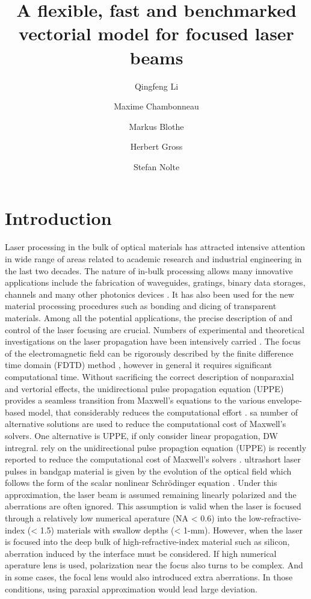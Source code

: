 \documentclass[9pt,twocolumn,twoside]{osajnl}
\title{A flexible, fast and benchmarked vectorial model for focused laser beams}
\author[1,*]{Qingfeng Li}
\author[1]{Maxime Chambonneau}
\author[1]{Markus Blothe}
\author[1,2]{Herbert Gross}
\author[1,2]{Stefan Nolte}
\affil[1]{Institute of Applied Physics, Abbe Ceter of Photonics, Friedirich-Schiller-University Jena, Albert-Einstein-Str. 15, 07745 Jena, Germany}
\affil[2]{Fraunhofer Institute for Applied Optics and Precision Engineering, Albert-Einstein-Str. 7, 07745 Jena, Germany}
\affil[*]{Corresponding author: qingfeng.li@uni-jena.de} %
\begin{document}
\maketitle

\section{Introduction}\label{section:1}

Laser processing in the bulk of optical materials has attracted intensive attention in wide range of areas related to academic research and industrial engineering in the last two decades. The nature of in-bulk processing allows many innovative applications include the fabrication of waveguides, gratings, binary data storages, channels and many other photonics devices \cite{Itoh2006, Gattass2008}. It has also been used for the new material processing procedures such as bonding \cite{Cvecek2019} and dicing \cite{Meyer2019} of transparent materials. Among all the potential applications, the precise description of  and control of the laser focusing are crucial. Numbers of experimental and theoretical investigations on the laser propagation have been intensively carried \cite{Couairon2007}. %
The focus of the electromagnetic field can be rigorously described by the finite difference time domain (FDTD) method \cite{liu2000three}, however in general it requires significant computational time. Without sacrificing the correct description of nonparaxial and vertorial effects, the unidirectional pulse propagation equation (UPPE) provides a seamless transition from Maxwell’s equations to the various envelope-based model, that considerably reduces the computational effort \cite{PhysRevLett.89.283902, PhysRevE.70.036604}.  sa number of alternative solutions are used to reduce the computational cost of Maxwell's solvers. One alternative is UPPE, if only consider linear propagation, DW intregral.   rely on the unidirectional pulse propagtion equation (UPPE) is recently reported to reduce the computational cost of Maxwell's solvers \cite{shipilo2019tight}. ultrashort laser pulses in bandgap material is given by the evolution of the optical field which follows the form of the scalar nonlinear Schr\"odinger equation  \cite{Sudrie2002}. Under this approximation, the laser beam is assumed remaining linearly polarized and the aberrations are often ignored. This assumption is valid when the laser is focused through a relatively low numerical aperature (NA < 0.6) into the low-refractive-index (< 1.5) materials with swallow depths (< 1-mm). However, when the laser is focused into the deep bulk of high-refractive-index material such as silicon, aberration induced by the interface must be considered. If high numerical aperature lens is used, polarization near the focus also turns to be complex. And in some cases, the focal lens would also introduced extra aberrations. In those conditions, using paraxial approximation would lead large deviation. 
\end{document}
